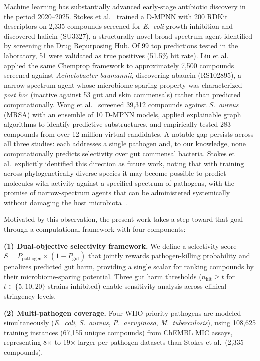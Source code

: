 \documentclass{article}
\newcommand{\pp}{P_{\mathrm{pathogen}}}
\newcommand{\pg}{P_{\mathrm{gut}}}
\begin{document}
Machine learning has substantially advanced early-stage antibiotic discovery in the period 2020--2025.
Stokes et al.~\citep{stokes2020} trained a D-MPNN with 200 RDKit descriptors on 2,335 compounds screened for \textit{E.~coli} growth inhibition and discovered halicin (SU3327), a structurally novel broad-spectrum agent identified by screening the Drug Repurposing Hub.
Of 99 top predictions tested in the laboratory, 51 were validated as true positives (51.5\% hit rate).
Liu et al.~\citep{liu2023} applied the same Chemprop framework to approximately 7,500 compounds screened against \textit{Acinetobacter baumannii}, discovering abaucin (RS102895), a narrow-spectrum agent whose microbiome-sparing property was characterized \emph{post hoc} (inactive against 53 gut and skin commensals) rather than predicted computationally.
Wong et al.~\citep{wong2024} screened 39,312 compounds against \textit{S.~aureus} (MRSA) with an ensemble of 10 D-MPNN models, applied explainable graph algorithms to identify predictive substructures, and empirically tested 283 compounds from over 12 million virtual candidates.
A notable gap persists across all three studies: each addresses a single pathogen and, to our knowledge, none computationally predicts selectivity over gut commensal bacteria.
Stokes et al.\ explicitly identified this direction as future work, noting that with training across phylogenetically diverse species it may become possible to predict molecules with activity against a specified spectrum of pathogens, with the promise of narrow-spectrum agents that can be administered systemically without damaging the host microbiota~\citep{stokes2020}.

Motivated by this observation, the present work takes a step toward that goal through a computational framework with four components:

\textbf{(1) Dual-objective selectivity framework.}
We define a selectivity score $S = \pp \times (1 - \pg)$ that jointly rewards pathogen-killing probability and penalizes predicted gut harm, providing a single scalar for ranking compounds by their microbiome-sparing potential.
Three gut harm thresholds ($n_{\mathrm{hit}} \geq t$ for $t \in \{5, 10, 20\}$ strains inhibited) enable sensitivity analysis across clinical stringency levels.

\textbf{(2) Multi-pathogen coverage.}
Four WHO-priority pathogens are modeled simultaneously (\textit{E.~coli}, \textit{S.~aureus}, \textit{P.~aeruginosa}, \textit{M.~tuberculosis}), using 108,625 training instances (67,155 unique compounds) from ChEMBL MIC assays, representing 8$\times$ to 19$\times$ larger per-pathogen datasets than Stokes et al.\ (2,335 compounds).
\end{document}
